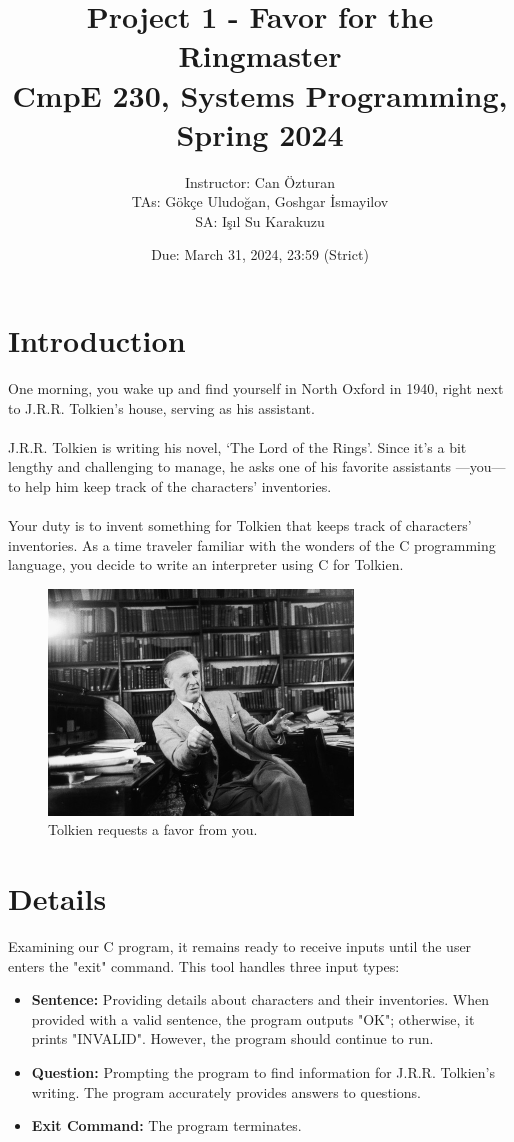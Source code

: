 \documentclass[12pt]{article}
\title{\vspace{-1cm} \Huge Project 1 - Favor for the Ringmaster
\\ \LARGE CmpE 230,  Systems Programming, Spring 2024 }
\author{
  Instructor: Can Özturan\\
  TAs: Gökçe Uludoğan, Goshgar İsmayilov\\
  SA: Işıl Su Karakuzu
}
\date{Due: March 31, 2024, 23:59 (Strict)}
\begin{document}
  \maketitle
  \section{Introduction}

\indent \indent 
One morning, you wake up and find yourself in North Oxford in 1940, right next to J.R.R. Tolkien's house, serving as his assistant.
\\\\
\indent J.R.R. Tolkien is writing his novel, `The Lord of the Rings'. Since it's a bit lengthy and challenging to manage, he asks one of his favorite assistants —you— to help him keep track of the characters' inventories.
\\\\
\indent Your duty is to invent something for Tolkien that keeps track of characters' inventories. As a time traveler familiar with the wonders of the C programming language, you decide to write an interpreter using C for Tolkien.
\\

\begin{figure}[h]
        \includegraphics[width=1\linewidth, height=6cm, keepaspectratio]{tolkien.jpeg}
        \centering
        \captionsetup{justification=centering}
        \caption{Tolkien requests a favor from you.}
    \label{fig:image2}
\end{figure}


\pagebreak
\section{Details}
\indent Examining our C program, it remains ready to receive inputs until the user enters the "exit" command. This tool handles three input types:
\begin{itemize}
    \item \textbf{Sentence:} Providing details about characters and their inventories. When provided with a valid sentence, the program outputs "OK"; otherwise, it prints "INVALID". However, the program should continue to run.
    \item \textbf{Question:} Prompting the program to find information for J.R.R. Tolkien's writing. The program accurately provides answers to questions.
    \item \textbf{Exit Command:} The program terminates.
\end{itemize}
\end{document}
